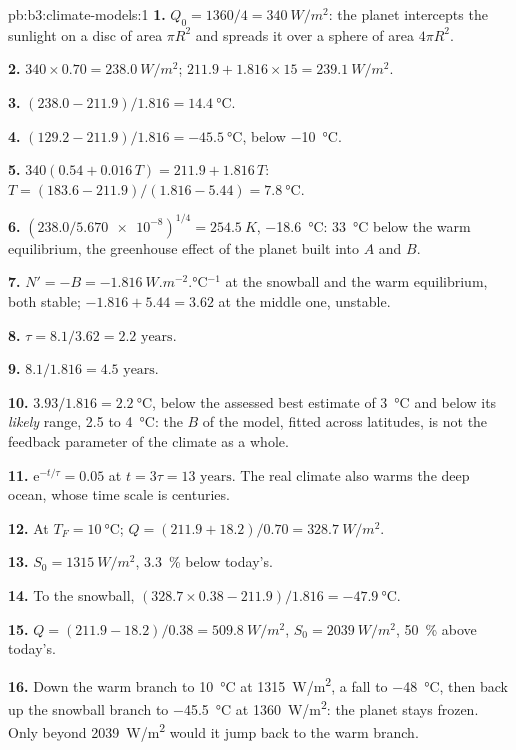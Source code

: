 \begin{solution}{pb:b3:climate-models:1}
\textbf{1.} $Q_0 = 1360/4 = \qty{340}{W/m^2}$: the planet intercepts the
sunlight on a disc of area $\pi R^2$ and spreads it over a sphere of area
$4\pi R^2$.

\textbf{2.} $340\times0.70 = \qty{238.0}{W/m^2}$; $211.9 + 1.816\times15 =
\qty{239.1}{W/m^2}$.

\textbf{3.} $(238.0 - 211.9)/1.816 = \qty{14.4}{\celsius}$.

\textbf{4.} $(129.2 - 211.9)/1.816 = \qty{-45.5}{\celsius}$, below
\qty{-10}{\celsius}.

\textbf{5.} $340(0.54 + 0.016\,T) = 211.9 + 1.816\,T$: $T =
(183.6 - 211.9)/(1.816 - 5.44) = \qty{7.8}{\celsius}$.

\textbf{6.} $(238.0/\num{5.670e-8})^{1/4} = \qty{254.5}{K}$,
\qty{-18.6}{\celsius}: \qty{33}{\celsius} below the warm equilibrium, the
greenhouse effect of the planet built into $A$ and $B$.

\textbf{7.} $N' = -B = \qty{-1.816}{W.m^{-2}.\celsius^{-1}}$ at the
snowball and the warm equilibrium, both stable; $-1.816 + 5.44 =
\num{+3.62}$ at the middle one, unstable.

\textbf{8.} $\tau = 8.1/3.62 = \num{2.2}\text{ years}$.

\textbf{9.} $8.1/1.816 = \num{4.5}\text{ years}$.

\textbf{10.} $3.93/1.816 = \qty{2.2}{\celsius}$, below the assessed best
estimate of \qty{3}{\celsius} and below its \emph{likely} range, 2.5 to
\qty{4}{\celsius}: the $B$ of the model, fitted across latitudes, is not
the feedback parameter of the climate as a whole.

\textbf{11.} $\mathrm e^{-t/\tau} = 0.05$ at $t = 3\tau =
\num{13}\text{ years}$. The real climate also warms the deep ocean, whose time
scale is centuries.

\textbf{12.} At $T_F = \qty{10}{\celsius}$; $Q = (211.9 + 18.2)/0.70 =
\qty{328.7}{W/m^2}$.

\textbf{13.} $S_0 = \qty{1315}{W/m^2}$, \qty{3.3}{\percent} below today's.

\textbf{14.} To the snowball, $(328.7\times0.38 - 211.9)/1.816 =
\qty{-47.9}{\celsius}$.

\textbf{15.} $Q = (211.9 - 18.2)/0.38 = \qty{509.8}{W/m^2}$, $S_0 =
\qty{2039}{W/m^2}$, \qty{50}{\percent} above today's.

\textbf{16.} Down the warm branch to \qty{10}{\celsius} at
\qty{1315}{W/m^2}, a fall to \qty{-48}{\celsius}, then back up the
snowball branch to \qty{-45.5}{\celsius} at \qty{1360}{W/m^2}: the planet
stays frozen. Only beyond \qty{2039}{W/m^2} would it jump back to the warm
branch.


\end{solution}
